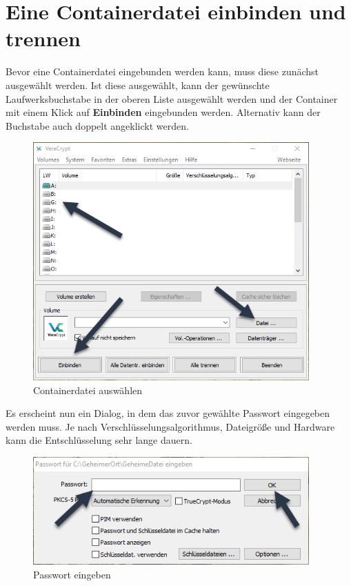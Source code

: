 \documentclass[12pt,a4paper]{scrreprt}
\begin{document}
\newpage

\section{Eine Containerdatei einbinden und trennen}

Bevor eine Containerdatei eingebunden werden kann, muss diese zunächst ausgewählt werden. Ist diese ausgewählt, kann der gewünschte Laufwerksbuchstabe in der oberen Liste ausgewählt werden und der Container mit einem Klick auf \textbf{Einbinden} eingebunden werden. Alternativ kann der Buchstabe auch doppelt angeklickt werden.

\begin{figure}[h]
\begin{center}
\includegraphics[width=300pt]{media/selectfile.png}
\caption{Containerdatei auswählen}
\label{selectcontainer}
\end{center}
\end{figure}

\noindent Es erscheint nun ein Dialog, in dem das zuvor gewählte Passwort eingegeben werden muss. Je nach Verschlüsselungsalgorithmus, Dateigröße und Hardware kann die Entschlüsselung sehr lange dauern.

\begin{figure}[h]
\begin{center}
\includegraphics[width=300pt]{media/typepassword.png}
\caption{Passwort eingeben}
\label{typepassword}
\end{center}
\end{figure}
\end{document}
